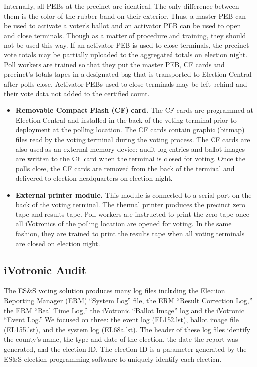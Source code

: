 Internally, all PEBs at the precinct are identical. The only difference between them is the color of the rubber band on their exterior. Thus, a master PEB can be used to activate a voter's ballot and an activator PEB can be used to open and close terminals. Though as a matter of procedure and training, they should not be used this way. If an activator PEB is used to close terminals, the precinct vote totals may be partially uploaded to the aggregated totals on election night. Poll workers are trained so that they put the master PEB, CF cards and precinct's totals tapes in a designated bag that is transported to Election Central after polls close.  Activator PEBs used to close terminals may be left behind and their vote data not added to the certified count.
\begin{itemize}
\item \textbf{Removable Compact Flash (CF) card.} The CF cards are programmed at Election Central and installed in the back of the voting terminal prior to deployment at the polling location. The CF cards contain graphic (bitmap) files read by the voting terminal during the voting process. The CF cards are also used as an external memory device: audit log entries and ballot images are written to the CF card when the terminal is closed for voting. Once the polls close, the CF cards are removed from the back of the terminal and delivered to election headquarters on election night. 

\item \textbf{External printer module.} This module is connected to a serial port on the back of the voting terminal. The thermal printer produces the precinct zero tape and results tape. Poll workers are instructed to print the zero tape once all iVotronics of the polling location are opened for voting. In the same fashion, they are trained to print the results tape when all voting terminals are closed on election night.
\end{itemize}

\subsection{iVotronic Audit}
The ES\&S voting solution produces many log files including the Election Reporting Manager (ERM) \textquotedblleft System Log\textquotedblright \hspace{1 mm} file, the ERM \textquotedblleft Result Correction Log,\textquotedblright \hspace{1 mm} the ERM \textquotedblleft Real Time Log,\textquotedblright \hspace{1 mm} the iVotronic \textquotedblleft Ballot Image\textquotedblright \hspace{1 mm} log and the iVotronic \textquotedblleft Event Log.\textquotedblright \hspace{2 mm} We focused on three: the event log (EL152.lst), ballot image file (EL155.lst), and the system log (EL68a.lst).  The header of these log files identify the county's name, the type and date of the election, the date the report was generated, and the election ID. The election ID is a parameter generated by the ES\&S election programming software to uniquely identify each election. 
 
